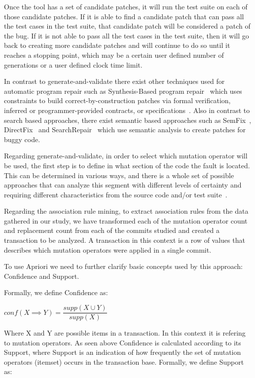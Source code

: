 \documentclass[conference]{IEEEtran}
\begin{document}
Once the tool has a set of candidate patches, it will run the test suite on each 
of those candidate patches. If it is able to find a candidate patch that can 
pass all the test cases in the test suite, that candidate patch will be 
considered a patch of the bug. If it is not able to pass all the test cases in 
the test suite, then it will go back to creating more candidate patches and will 
continue to do so until it reaches a stopping point, which may be a certain user 
defined number of generations or a user defined clock time limit.


In contrast to generate-and-validate there exist other techniques used for 
automatic program repair such as Synthesis-Based program 
repair~\cite{jin11,pei14} which uses constraints to build 
correct-by-construction patches via formal verification, inferred or 
programmer-provided contracts,
or specifications~\cite{smith15}. Also in contrast to search based approaches, there exist semantic based approaches such as SemFix~\cite{nguyen13}, DirectFix~\cite{mechtaev15} and SearchRepair~\cite{ke15} which use semantic analysis to create patches for buggy code.

Regarding generate-and-validate, in
order to select which mutation operator will be used, the 
first step is to define in what section of the code the fault is located. This can be determined in various ways, and 
there is 
a whole set of
possible approaches that can analyze this segment with different levels of certainty and 
requiring different characteristics from the source code and/or test 
suite~\cite{Jones05,Jones02,Chen02,legoues12,Qi13,Qi2013,Abreu07,wong09}. 

Regarding the association rule mining, to extract association rules from the data gathered in our study, we 
have transformed each of the mutation operator count and replacement count from 
each of the commits studied and created a transaction to be analyzed. A transaction in this context is a row of values that describes which mutation operators were applied in a single commit.

To use Apriori we need to further clarify basic concepts used by this approach: Confidence and Support.

Formally, we define Confidence as:

\begin{center}
$conf(X \implies Y) = \dfrac{supp(X \cup Y)}{supp(X)}$ 
\end{center}

Where X and Y are possible items in a transaction. In this context it is refering to mutation operators. As seen above Confidence is calculated according to its Support, where Support is an indication of how frequently the set of mutation operators (itemset) occurs in the transaction base.
Formally, we define Support as:
\end{document}
